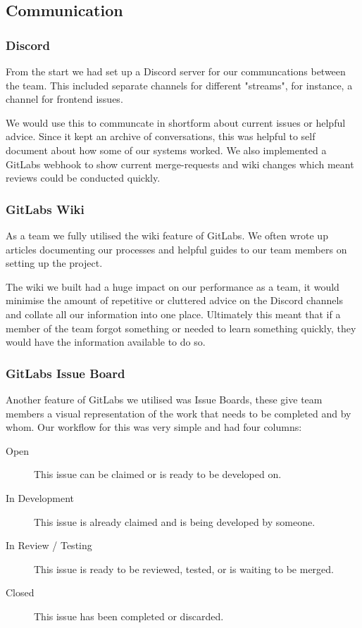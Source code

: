 \documentclass{article}
\begin{document}
\subsection{Communication}
\subsubsection{Discord}
From the start we had set up a Discord server for our communcations between the
team. This included separate channels for different "streams", for instance, a
channel for frontend issues.

We would use this to communcate in shortform about current issues or helpful
advice. Since it kept an archive of conversations, this was helpful to self
document about how some of our systems worked. We also implemented a GitLabs
webhook to show current merge-requests and wiki changes which meant reviews
could be conducted quickly.

\subsubsection{GitLabs Wiki}
As a team we fully utilised the wiki feature of GitLabs. We often wrote up
articles documenting our processes and helpful guides to our team members on
setting up the project.

The wiki we built had a huge impact on our performance as a team, it would
minimise the amount of repetitive or cluttered advice on the Discord channels
and collate all our information into one place. Ultimately this meant that if a
member of the team forgot something or needed to learn something quickly, they
would have the information available to do so.

\subsubsection{GitLabs Issue Board}
Another feature of GitLabs we utilised was Issue Boards, these give team
members a visual representation of the work that needs to be completed and by
whom. Our workflow for this was very simple and had four columns:

\begin{description}
  \item[Open] This issue can be claimed or is ready to be developed on.
  \item[In Development] This issue is already claimed and is being developed by
    someone.
  \item[In Review / Testing] This issue is ready to be reviewed, tested, or is waiting
    to be merged.
  \item[Closed] This issue has been completed or discarded.
\end{description}
\end{document}
